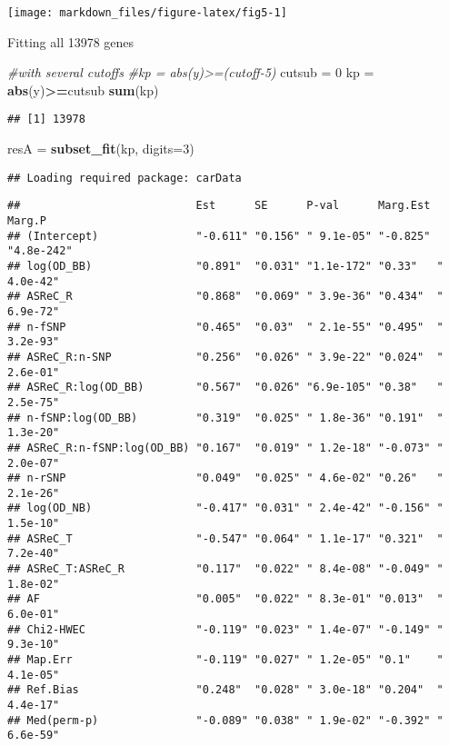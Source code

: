 \documentclass[]{article}
\newenvironment{Shaded}{\begin{snugshade}}{\end{snugshade}}
\newcommand{\KeywordTok}[1]{\textcolor[rgb]{0.13,0.29,0.53}{\textbf{#1}}}
\newcommand{\DataTypeTok}[1]{\textcolor[rgb]{0.13,0.29,0.53}{#1}}
\newcommand{\DecValTok}[1]{\textcolor[rgb]{0.00,0.00,0.81}{#1}}
\newcommand{\StringTok}[1]{\textcolor[rgb]{0.31,0.60,0.02}{#1}}
\newcommand{\CommentTok}[1]{\textcolor[rgb]{0.56,0.35,0.01}{\textit{#1}}}
\newcommand{\OperatorTok}[1]{\textcolor[rgb]{0.81,0.36,0.00}{\textbf{#1}}}
\newcommand{\NormalTok}[1]{#1}
\begin{document}
\begin{center}\texttt{[image: markdown\_files/figure-latex/fig5-1]} \end{center}

Fitting all 13978 genes

\begin{Shaded}
\begin{Highlighting}[]
\CommentTok{#with several cutoffs}
\CommentTok{#kp = abs(y)>=(cutoff-5)}
\NormalTok{cutsub =}\StringTok{ }\DecValTok{0}
\NormalTok{kp =}\StringTok{ }\KeywordTok{abs}\NormalTok{(y)}\OperatorTok{>=}\NormalTok{cutsub}
\KeywordTok{sum}\NormalTok{(kp)}
\end{Highlighting}
\end{Shaded}

\begin{verbatim}
## [1] 13978
\end{verbatim}

\begin{Shaded}
\begin{Highlighting}[]
\NormalTok{resA =}\StringTok{ }\KeywordTok{subset_fit}\NormalTok{(kp, }\DataTypeTok{digits=}\DecValTok{3}\NormalTok{)}
\end{Highlighting}
\end{Shaded}

\begin{verbatim}
## Loading required package: carData
\end{verbatim}

\begin{Shaded}
\end{Shaded}

\begin{verbatim}
##                           Est      SE      P-val      Marg.Est Marg.P    
## (Intercept)               "-0.611" "0.156" " 9.1e-05" "-0.825" "4.8e-242"
## log(OD_BB)                "0.891"  "0.031" "1.1e-172" "0.33"   " 4.0e-42"
## ASReC_R                   "0.868"  "0.069" " 3.9e-36" "0.434"  " 6.9e-72"
## n-fSNP                    "0.465"  "0.03"  " 2.1e-55" "0.495"  " 3.2e-93"
## ASReC_R:n-SNP             "0.256"  "0.026" " 3.9e-22" "0.024"  " 2.6e-01"
## ASReC_R:log(OD_BB)        "0.567"  "0.026" "6.9e-105" "0.38"   " 2.5e-75"
## n-fSNP:log(OD_BB)         "0.319"  "0.025" " 1.8e-36" "0.191"  " 1.3e-20"
## ASReC_R:n-fSNP:log(OD_BB) "0.167"  "0.019" " 1.2e-18" "-0.073" " 2.0e-07"
## n-rSNP                    "0.049"  "0.025" " 4.6e-02" "0.26"   " 2.1e-26"
## log(OD_NB)                "-0.417" "0.031" " 2.4e-42" "-0.156" " 1.5e-10"
## ASReC_T                   "-0.547" "0.064" " 1.1e-17" "0.321"  " 7.2e-40"
## ASReC_T:ASReC_R           "0.117"  "0.022" " 8.4e-08" "-0.049" " 1.8e-02"
## AF                        "0.005"  "0.022" " 8.3e-01" "0.013"  " 6.0e-01"
## Chi2-HWEC                 "-0.119" "0.023" " 1.4e-07" "-0.149" " 9.3e-10"
## Map.Err                   "-0.119" "0.027" " 1.2e-05" "0.1"    " 4.1e-05"
## Ref.Bias                  "0.248"  "0.028" " 3.0e-18" "0.204"  " 4.4e-17"
## Med(perm-p)               "-0.089" "0.038" " 1.9e-02" "-0.392" " 6.6e-59"
\end{verbatim}
\end{document}

